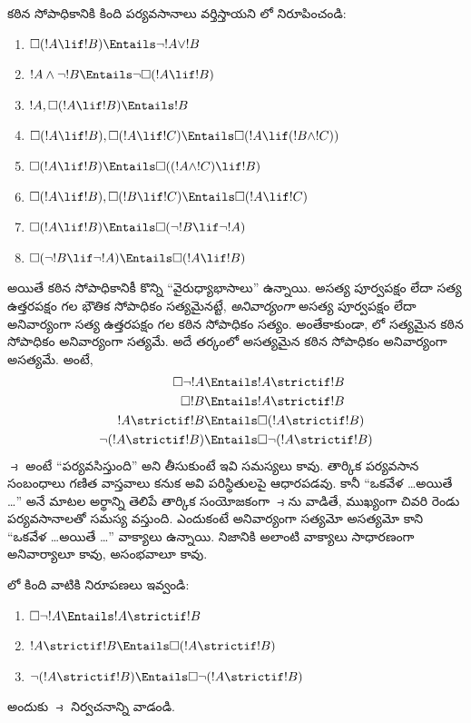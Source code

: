 \documentclass[../../../include/open-logic-section]{subfiles}
\begin{document}
\begin{prob}
  కఠిన సోపాధికానికి కింది పర్యవసానాలు
  వర్తిస్తాయని లో నిరూపించండి:
  \begin{enumerate}
  \item  $\Box(!A \lif !B) \Entails \lnot !A \lor !B$
  \item $!A \land \lnot !B \Entails \lnot\Box(!A \lif !B)$
  \item $!A, \Box(!A \lif !B) \Entails !B$
  \item $\Box(!A \lif !B), \Box(!A \lif !C) \Entails \Box(!A \lif (!B
    \land !C))$
  \item $\Box(!A \lif !B) \Entails \Box((!A \land !C) \lif !B)$
  \item $\Box(!A \lif !B), \Box(!B \lif !C) \Entails \Box(!A
    \lif !C)$
  \item $\Box(!A \lif !B) \Entails \Box(\lnot !B \lif \lnot !A)$
  \item $\Box(\lnot !B \lif \lnot !A) \Entails \Box(!A \lif !B)$
  \end{enumerate}
  \end{prob}

అయితే కఠిన సోపాధికానికీ కొన్ని
``వైరుధ్యాభాసాలు'' ఉన్నాయి.
అసత్య పూర్వపక్షం లేదా సత్య ఉత్తరపక్షం
గల భౌతిక సోపాధికం సత్యమైనట్టే,
\emph{అనివార్యంగా} అసత్య పూర్వపక్షం
లేదా అనివార్యంగా సత్య ఉత్తరపక్షం గల
కఠిన సోపాధికం సత్యం. అంతేకాకుండా,
లో సత్యమైన కఠిన సోపాధికం అనివార్యంగా సత్యమే.
అదే తర్కంలో అసత్యమైన కఠిన సోపాధికం అనివార్యంగా అసత్యమే. అంటే,
\begin{align}
  \Box \lnot !A & \Entails !A \strictif !B\\
  \Box !B & \Entails !A \strictif !B\\
  !A \strictif !B& \Entails \Box(!A \strictif !B)\\
  \lnot(!A \strictif !B) & \Entails \Box\lnot(!A \strictif !B)
\end{align}
$\strictif$ అంటే ``పర్యవసిస్తుంది'' అని తీసుకుంటే ఇవి సమస్యలు కావు.
తార్కిక పర్యవసాన సంబంధాలు గణిత వాస్తవాలు కనుక అవి
పరిస్థితులపై ఆధారపడవు. కానీ ``ఒకవేళ \dots అయితే \dots'' అనే
మాటల అర్థాన్ని తెలిపే తార్కిక సంయోజకంగా $\strictif$ను వాడితే,
ముఖ్యంగా చివరి రెండు పర్యవసానాలతో సమస్య వస్తుంది. ఎందుకంటే
అనివార్యంగా సత్యమో అసత్యమో కాని ``ఒకవేళ \dots అయితే \dots''
వాక్యాలు ఉన్నాయి. నిజానికి అలాంటి వాక్యాలు సాధారణంగా
అనివార్యాలూ కావు, అసంభవాలూ కావు.

\begin{prob}
  లో కింది వాటికి నిరూపణలు ఇవ్వండి:
  \begin{enumerate}
    \item  $\Box \lnot !A \Entails !A \strictif !B$
    \item $!A \strictif !B \Entails \Box(!A \strictif !B)$
    \item $\lnot(!A \strictif !B)  \Entails \Box\lnot(!A \strictif !B)$
  \end{enumerate}
  అందుకు $\strictif$ నిర్వచనాన్ని వాడండి.
\end{prob}
\end{document}
